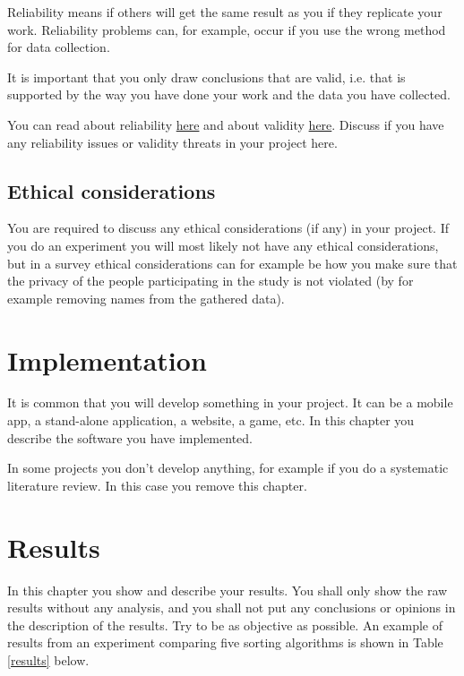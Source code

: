 \documentclass[a4paper,12pt]{article}
\begin{document}
Reliability means if others will get the same result as you if they replicate your work. Reliability problems can, for example, occur if you use the wrong method for data collection.

It is important that you only draw conclusions that are valid, i.e. that is supported by the way you have done your work and the data you have collected. 

You can read about reliability \href{https://coursepress.lnu.se/subject/thesis-projects/reliability/}{here} and about validity \href{https://coursepress.lnu.se/subject/thesis-projects/validity/}{here}. Discuss if you have any reliability issues or validity threats in your project here.

\subsection{Ethical considerations}
You are required to discuss any ethical considerations (if any) in your project. If you do an experiment you will most likely not have any ethical considerations, but in a survey ethical considerations can for example be how you make sure that the privacy of the people participating in the study is not violated (by for example removing names from the gathered data). 

\newpage

\section{Implementation}
It is common that you will develop something in your project. It can be a mobile app, a stand-alone application, a website, a game, etc. In this chapter you describe the software you have implemented. 

In some projects you don't develop anything, for example if you do a systematic literature review. In this case you remove this chapter.

\newpage

\section{Results}
In this chapter you show and describe your results. You shall only show the raw results without any analysis, and you shall not put any conclusions or opinions in the description of the results. Try to be as objective as possible. An example of results from an experiment comparing five sorting algorithms is shown in Table \ref{results} below.\\
\end{document}
